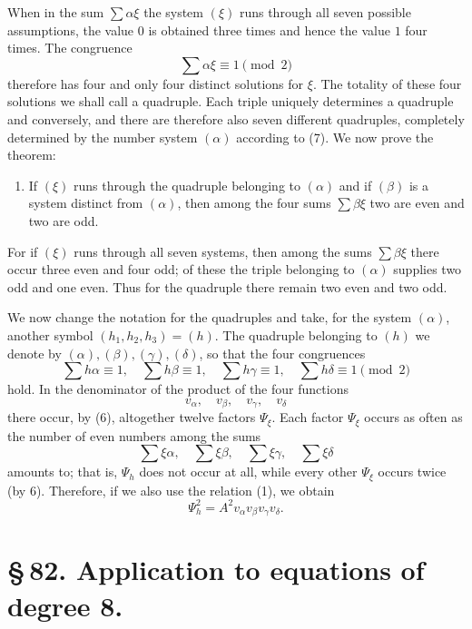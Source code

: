 \documentclass[11pt]{article}
\begin{document}
When in the sum $\sum\alpha\xi$ the system $(\xi)$ runs through all seven possible assumptions, the value $0$ is obtained three times and hence the value $1$ four times. The congruence
\begin{equation}
 \sum\alpha\xi\equiv1\pmod2
 \tag{7}
\end{equation}
therefore has four and only four distinct solutions for $\xi$. The totality of these four solutions we shall call a quadruple. Each triple uniquely determines a quadruple and conversely, and there are therefore also seven different quadruples, completely determined by the number system $(\alpha)$ according to (7). We now prove the theorem:
\begin{enumerate}[label=\arabic*.,leftmargin=2.8em,start=6]
\item If $(\xi)$ runs through the quadruple belonging to $(\alpha)$ and if $(\beta)$ is a system distinct from $(\alpha)$, then among the four sums $\sum\beta\xi$ two are even and two are odd.
\end{enumerate}
For if $(\xi)$ runs through all seven systems, then among the sums $\sum\beta\xi$ there occur three even and four odd; of these the triple belonging to $(\alpha)$ supplies two odd and one even. Thus for the quadruple there remain two even and two odd.

We now change the notation for the quadruples and take, for the system $(\alpha)$, another symbol $(h_1,h_2,h_3)=(h)$. The quadruple belonging to $(h)$ we denote by $(\alpha),(\beta),(\gamma),(\delta)$, so that the four congruences
\begin{equation}
 \sum h\alpha\equiv1,
 \quad \sum h\beta\equiv1,
 \quad \sum h\gamma\equiv1,
 \quad \sum h\delta\equiv1\pmod2
 \tag{8}
\end{equation}
hold. In the denominator of the product of the four functions
\[
 v_\alpha,
 \quad v_\beta,
 \quad v_\gamma,
 \quad v_\delta
\]
there occur, by (6), altogether twelve factors $\Psi_\xi$. Each factor $\Psi_\xi$ occurs as often as the number of even numbers among the sums
\[
 \sum\xi\alpha,
 \quad \sum\xi\beta,
 \quad \sum\xi\gamma,
 \quad \sum\xi\delta
\]
amounts to; that is, $\Psi_h$ does not occur at all, while every other $\Psi_\xi$ occurs twice (by 6). Therefore, if we also use the relation (1), we obtain
\begin{equation}
 \Psi_h^2=A^2v_\alpha v_\beta v_\gamma v_\delta.
 \tag{9}
\end{equation}

\section*{\S\,82. Application to equations of degree 8.}
\end{document}

